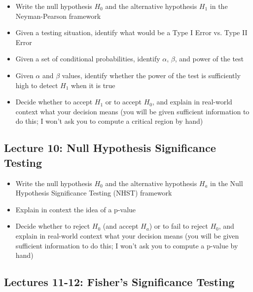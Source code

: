 \documentclass[11pt]{article} %
\begin{document}
\begin{itemize}
\item Write the null hypothesis $H_0$ and the alternative hypothesis $H_1$ in the Neyman-Pearson framework
\item Given a testing situation, identify what would be a Type I Error vs. Type II Error
\item Given a set of conditional probabilities, identify $\alpha$, $\beta$, and power of the test
\item Given $\alpha$ and $\beta$ values, identify whether the power of the test is sufficiently high to detect $H_1$ when it is true
\item Decide whether to accept $H_1$ or to accept $H_0$, and explain in real-world context what your decision means (you will be given sufficient information to do this; I won't ask you to compute a critical region by hand)
\end{itemize}

\subsection{Lecture 10: Null Hypothesis Significance Testing}

\begin{itemize}
\item Write the null hypothesis $H_0$ and the alternative hypothesis $H_a$ in the Null Hypothesis Significance Testing (NHST) framework
\item Explain in context the idea of a p-value
\item Decide whether to reject $H_0$ (and accept $H_a$) or to fail to reject $H_0$, and explain in real-world context what your decision means (you will be given sufficient information to do this; I won't ask you to compute a p-value by hand)
\end{itemize}

\subsection{Lectures 11-12: Fisher's Significance Testing}
\end{document}
